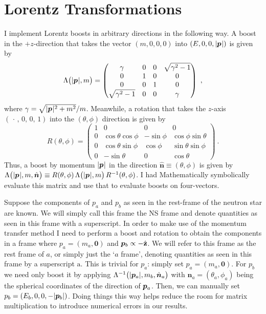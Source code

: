 \section{Lorentz Transformations}
I implement Lorentz boosts in arbitrary directions in the following way. A boost in the $+z$-direction that takes the vector $(m, 0, 0, 0)$ into $(E, 0, 0, |\pvec|)$ is given by 
\begin{equation}
    \Lambda \big(|\pvec|, m \big) =
    \begin{pmatrix}
        \gamma & 0 & 0 & \sqrt{\gamma^2 - 1} \\
        0 & 1 & 0 & 0 \\
        0 & 0 & 1 & 0 \\
        \sqrt{\gamma^2 - 1} & 0 & 0 & \gamma
    \end{pmatrix}  \ ,
\end{equation}
where $\gamma = \sqrt{|\pvec|^2 + m^2} / m$.
Meanwhile, a rotation that takes the $z$-axis $(\,\cdot\,,\, 0,\, 0,\, 1)$ into the $(\theta, \phi)$ direction is given by 
\begin{equation}
    R(\theta, \phi) = 
    \begin{pmatrix}
        1 & 0 & 0 & 0 \\
        0 & \cos \theta \cos \phi & - \sin \phi & \cos \phi \sin \theta \\
        0 & \cos \theta \sin \phi & \cos \phi & \sin \theta \sin \phi \\
        0 & - \sin \theta & 0 & \cos \theta
    \end{pmatrix} \ .
\end{equation}
Thus, a boost by momentum $|\pvec|$ in the direction $\hat{\bm{n}} \equiv (\theta, \phi)$ is given by $\Lambda\big(|\pvec|, m, \hat{\bm{n}}\big) \equiv R(\theta, \phi) \, \Lambda \big(|\pvec|, m \big) \, R^{-1}(\theta, \phi)$. 
I had Mathematically symbolically evaluate this matrix and use that to evaluate boosts on four-vectors. 

\label{subsec:boosting-in-state-momenta}
Suppose the components of $p_a$ and $p_b$ as seen in the rest-frame of the neutron star are known.
We will simply call this frame the NS frame and denote quantities as seen in this frame with a superscript.
In order to make use of the momentum transfer method I need to perform a boost and rotation to obtain the components in a frame where $p_a = (m_a, \bm{0})$ and $\pvec[b] \propto - \hat{\mathbf{z}}$.
We will refer to this frame as the rest frame of $a$, or simply just the `$a$ frame', denoting quantities as seen in this frame by a superscript $\mathrm{a}$.
This is trivial for $p_a$: simply set $p_a = (m_a, \bm{0})$. 
For $p_b$ we need only boost it by applying $\Lambda^{-1}\big(|\pvec[a]|, m_b, \hat{\bm{n}}_a \big)$ with $\bm{n}_a = (\theta_a, \phi_a)$ being the spherical coordinates of the direction of $\pvec[a]$. 
Then, we can manually set $p_b = (E_b, 0, 0, -|\pvec[b]|)$. 
Doing things this way helps reduce the room for matrix multiplication to introduce numerical errors in our results.


